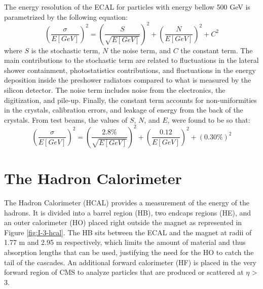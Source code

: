     The energy resolution of the ECAL for particles with energy bellow 500 GeV is parametrized by the following equation:
    \begin{equation}
      \left( \frac{\sigma}{E[GeV]} \right)^2 = \left( \frac{S}{\sqrt{E[GeV]}} \right)^2 + \left( \frac{N}{E[GeV]} \right)^2 + C^2
    \end{equation}
    where $ S $ is the stochastic term, $ N $ the noise term, and $ C $ the constant term. The main contributions to the stochastic term are related to fluctuations in the lateral shower containment, photostatistics contributions, and fluctuations in the energy deposition inside the preshower radiators compared to what is measured by the silicon detector. The noise term includes noise from the electronics, the digitization, and pile-up. Finally, the constant term accounts for non-uniformities in the crystals, calibration errors, and leakage of energy from the back of the crystals. From test beams, the values of $ S $, $ N $, and $ E $, were found to be so that: \\
    \begin{equation}
      \left( \frac{\sigma}{E[GeV]} \right)^2 = \left( \frac{2.8\%}{\sqrt{E[GeV]}} \right)^2 + \left( \frac{0.12}{E[GeV]} \right)^2 + (0.30\%)^2
    \end{equation}

  \section{The Hadron Calorimeter}

    The Hadron Calorimeter (HCAL) provides a measurement of the energy of the hadrons. It is divided into a barrel region (HB), two endcaps regions (HE), and an outer calorimeter (HO) placed right outside the magnet as represented in Figure \ref{fig:I-3-hcal}. The HB sits between the ECAL and the magnet at radii of 1.77 m and 2.95 m respectively, which limits the amount of material and thus absorption lengths that can be used, justifying the need for the HO to catch the tail of the cascades. An additional forward calorimeter (HF) is placed in the very forward region of CMS to analyze particles that are produced or scattered at $ \eta $ > 3. \\

